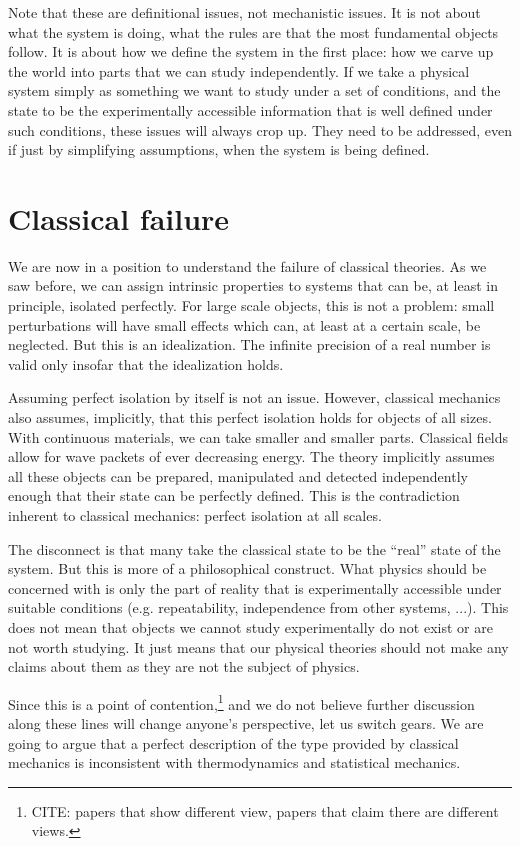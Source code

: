 \documentclass[10pt,twocolumn, nofootinbib]{revtex4-2}
\begin{document}
Note that these are definitional issues, not mechanistic issues. It is not about what the system is doing, what the rules are that the most fundamental objects follow. It is about how we define the system in the first place: how we carve up the world into parts that we can study independently. If we take a physical system simply as something we want to study under a set of conditions, and the state to be the experimentally accessible information that is well defined under such conditions, these issues will always crop up. They need to be addressed, even if just by simplifying assumptions, when the system is being defined.

\section{Classical failure}

We are now in a position to understand the failure of classical theories. As we saw before, we can assign intrinsic properties to systems that can be, at least in principle, isolated perfectly. For large scale objects, this is not a problem: small perturbations will have small effects which can, at least at a certain scale, be neglected. But this is an idealization. The infinite precision of a real number is valid only insofar that the idealization holds.

Assuming perfect isolation by itself is not an issue. However, classical mechanics also assumes, implicitly, that this perfect isolation holds for objects of all sizes. With continuous materials, we can take smaller and smaller parts. Classical fields allow for wave packets of ever decreasing energy. The theory implicitly assumes all these objects can be prepared, manipulated and detected independently enough that their state can be perfectly defined. This is the contradiction inherent to classical mechanics: perfect isolation at all scales.

The disconnect is that many take the classical state to be the ``real'' state of the system. But this is more of a philosophical construct. What physics should be concerned with is only the part of reality that is experimentally accessible under suitable conditions (e.g. repeatability, independence from other systems, ...). This does not mean that objects we cannot study experimentally do not exist or are not worth studying. It just means that our physical theories should not make any claims about them as they are not the subject of physics.

Since this is a point of contention,\footnote{CITE: papers that show different view, papers that claim there are different views.} and we do not believe further discussion along these lines will change anyone's perspective, let us switch gears. We are going to argue that a perfect description of the type provided by classical mechanics is inconsistent with thermodynamics and statistical mechanics.
\end{document}
